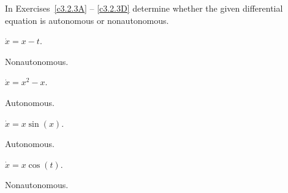 \documentclass{ximera}
\begin{document}
\noindent In Exercises~\ref{c3.2.3A} -- \ref{c3.2.3D} determine whether the 
given differential equation is autonomous or nonautonomous.
\begin{exercise} \label{c3.2.3A}
$\dot{x}=x-t$.

\begin{solution}
Nonautonomous.

\end{solution}
\end{exercise}
\begin{exercise} \label{c3.2.3B}
$\dot{x}=x^2-x$.

\begin{solution}
Autonomous.

\end{solution}
\end{exercise}
\begin{exercise} \label{c3.2.3C}
$\dot{x}=x\sin(x)$.

\begin{solution}
Autonomous.

\end{solution}
\end{exercise}
\begin{exercise} \label{c3.2.3D}
$\dot{x}=x\cos(t)$.

\begin{solution}
Nonautonomous.



\end{solution}
\end{exercise}


\CEXER
\end{document}

